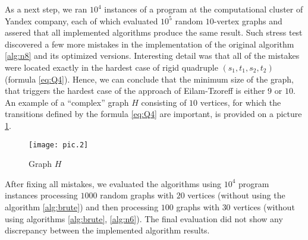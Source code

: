 As a next step, we ran $10^4$ instances of a program at the computational cluster of Yandex company, each of which evaluated $10^5$ random $10$-vertex graphs and assered that all implemented algorithms  produce the same result. Such stress test discovered a few more mistakes in the implementation of the original algorithm \ref{alg:n8} and its optimized versions. Interesting detail was that all of the mistakes were located exactly in the hardest case of rigid quadruple $(s_1, t_1, s_2, t_2)$ (formula \eqref{eq:Q4}). Hence, we can conclude that the minimum size of the graph, that triggers the hardest case of the approach of Eilam-Tzoreff is either $9$ or $10$. An example of a ``complex'' graph $H$ consisting of $10$ vertices, for which the transitions defined by the formula \eqref{eq:Q4} are important, is provided on a picture \ref{pic:hard}.

\begin{figure}
\caption{Graph $H$}
\label{pic:hard}
\centering
\texttt{[image: pic.2]}
\end{figure}

After fixing all mistakes, we evaluated the algorithms using $10^4$ program instances processing $1000$ random graphs with $20$ vertices (without using the algorithm \ref{alg:brute}) and then processing $100$ graphs with $30$ vertices (without using algorithms \ref{alg:brute}, \ref{alg:n6}). The final evaluation did not show any discrepancy between the implemented algorithm results.
